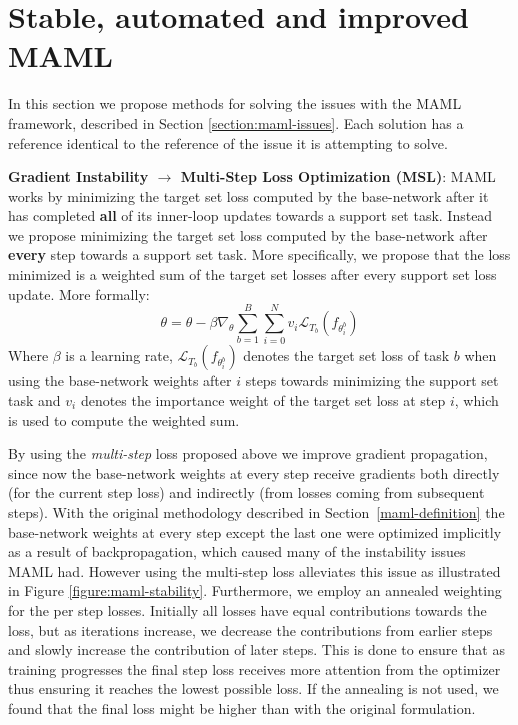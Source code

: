\documentclass{article} \usepackage[dvipsnames]{xcolor}
\begin{document}
\section{Stable, automated and improved MAML}\label{section:maml-fix}
In this section we propose methods for solving the issues with the MAML framework, described in Section \ref{section:maml-issues}. Each solution has a reference identical to the reference of the issue it is attempting to solve.

\textbf{Gradient Instability $\rightarrow$ Multi-Step Loss Optimization (MSL)}: MAML works by minimizing the target set loss computed by the base-network after it has completed \textbf{all} of its inner-loop updates towards a support set task. Instead we propose minimizing the target set loss computed by the base-network after \textbf{every} step towards a support set task. More specifically, we propose that the loss minimized is a weighted sum of the target set losses after every support set loss update. More formally:
\begin{equation}\label{maml_multi_outer_update}
\theta = \theta - \beta \nabla_{\theta} \sum_{b=1}^{B} \sum_{i=0}^{N} v_{i} \mathcal{L}_{T_{b}}(f_{\theta^{b}_{i}})
\end{equation}
Where $\beta$ is a learning rate, $\mathcal{L}_{T_{b}}(f_{\theta^{b}_{i}})$ denotes the target set loss of task $b$ when using the base-network weights after $i$ steps towards minimizing the support set task and $v_i$ denotes the importance weight of the target set loss at step $i$, which is used to compute the weighted sum.

By using the \emph{multi-step} loss proposed above we improve gradient propagation, since now the base-network weights at every step receive gradients both directly (for the current step loss) and indirectly (from losses coming from subsequent steps). With the original methodology described in Section~\ref{maml-definition} the base-network weights at every step except the last one were optimized implicitly as a result of backpropagation, which caused many of the instability issues MAML had. However using the multi-step loss alleviates this issue as illustrated in Figure \ref{figure:maml-stability}. Furthermore, we employ an annealed weighting for the per step losses. Initially all losses have equal contributions towards the loss, but as iterations increase, we decrease the contributions from earlier steps and slowly increase the contribution of later steps. This is done to ensure that as training progresses the final step loss receives more attention from the optimizer thus ensuring it reaches the lowest possible loss. If the annealing is not used, we found that the final loss might be higher than with the original formulation.
\end{document}
